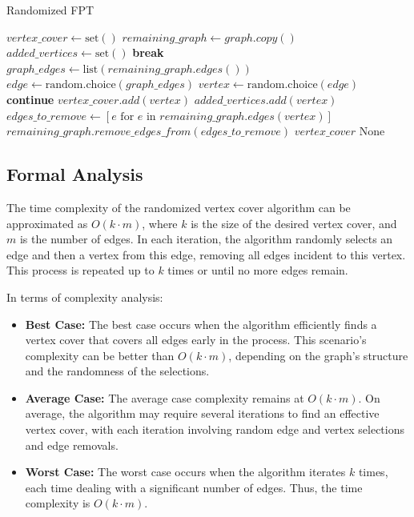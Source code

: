 \begin{algorithm}
\caption{Randomized FPT}
\begin{algorithmic}[1]

\State $vertex\_cover \gets \text{set}()$
\State $remaining\_graph \gets graph.copy()$
\State $added\_vertices \gets \text{set}()$
\State \textbf{break}
\EndIf
\State $graph\_edges \gets \text{list}(remaining\_graph.edges())$
\State $edge \gets \text{random.choice}(graph\_edges)$
\State $vertex \gets \text{random.choice}(edge)$
\State \textbf{continue}
\EndIf
\State $vertex\_cover.add(vertex)$
\State $added\_vertices.add(vertex)$
\State $edges\_to\_remove \gets [e \text{ for } e \text{ in } remaining\_graph.edges(vertex)]$
\State $remaining\_graph.remove\_edges\_from(
edges\_to\_remove)$
\EndWhile
{}
\State \Return $vertex\_cover$
\Else
\State \Return $\text{None}$
\EndIf
\EndProcedure
\end{algorithmic}
\end{algorithm}


\subsection{Formal Analysis}
The time complexity of the randomized vertex cover algorithm can be approximated as \(O(k \cdot m)\), where \(k\) is the size of the desired vertex cover, and \(m\) is the number of edges. In each iteration, the algorithm randomly selects an edge and then a vertex from this edge, removing all edges incident to this vertex. This process is repeated up to \(k\) times or until no more edges remain.

In terms of complexity analysis:
\begin{itemize}
  \item \textbf{Best Case:} The best case occurs when the algorithm efficiently finds a vertex cover that covers all edges early in the process. This scenario's complexity can be better than \(O(k \cdot m)\), depending on the graph's structure and the randomness of the selections.
  
  \item \textbf{Average Case:} The average case complexity remains at \(O(k \cdot m)\). On average, the algorithm may require several iterations to find an effective vertex cover, with each iteration involving random edge and vertex selections and edge removals.
  
  \item \textbf{Worst Case:} The worst case occurs when the algorithm iterates \(k\) times, each time dealing with a significant number of edges. Thus, the time complexity is \(O(k \cdot m)\).
\end{itemize}

